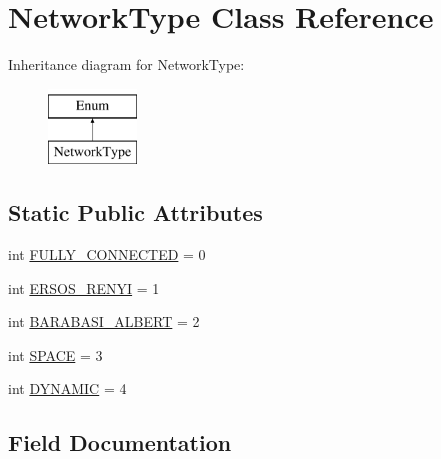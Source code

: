 \hypertarget{class_mu_mo_t_1_1_mu_mo_t_1_1_network_type}{}\section{Network\+Type Class Reference}
\label{class_mu_mo_t_1_1_mu_mo_t_1_1_network_type}
Inheritance diagram for Network\+Type\+:\begin{figure}[H]
\begin{center}
\leavevmode
\includegraphics[height=2.000000cm]{class_mu_mo_t_1_1_mu_mo_t_1_1_network_type}
\end{center}
\end{figure}
\subsection*{Static Public Attributes}
\begin{DoxyCompactItemize}
\item 
int \hyperlink{class_mu_mo_t_1_1_mu_mo_t_1_1_network_type_a6026c1d0088de63c8dbffa271c5cb8e4}{F\+U\+L\+L\+Y\+\_\+\+C\+O\+N\+N\+E\+C\+T\+ED} = 0
\item 
int \hyperlink{class_mu_mo_t_1_1_mu_mo_t_1_1_network_type_abfc09d249fa8a7e47ccae49424a21d61}{E\+R\+S\+O\+S\+\_\+\+R\+E\+N\+YI} = 1
\item 
int \hyperlink{class_mu_mo_t_1_1_mu_mo_t_1_1_network_type_a5684807d763efd4f800fe9a849cd962c}{B\+A\+R\+A\+B\+A\+S\+I\+\_\+\+A\+L\+B\+E\+RT} = 2
\item 
int \hyperlink{class_mu_mo_t_1_1_mu_mo_t_1_1_network_type_a03813c265f977cc034eb42fd3370bf3d}{S\+P\+A\+CE} = 3
\item 
int \hyperlink{class_mu_mo_t_1_1_mu_mo_t_1_1_network_type_ad86080ad7b724db9fc31c1e654eba020}{D\+Y\+N\+A\+M\+IC} = 4
\end{DoxyCompactItemize}


\subsection{Field Documentation}
\mbox{\label{class_mu_mo_t_1_1_mu_mo_t_1_1_network_type_a5684807d763efd4f800fe9a849cd962c}} 
